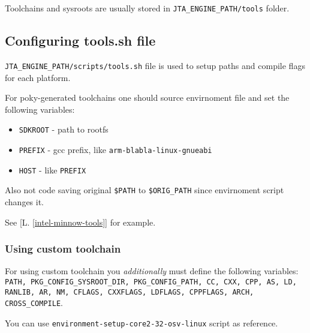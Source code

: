 




Toolchains and sysroots are usually stored in \texttt{JTA\_ENGINE\_PATH/tools} folder.

\subsection{Configuring tools.sh file}
\texttt{JTA\_ENGINE\_PATH/scripts/tools.sh} file is used to setup paths and compile flags for each platform.

For poky-generated toolchains one should source envirnoment file and set the following variables:
\begin{itemize}
\item \texttt{SDKROOT} - path to rootfs
\item \texttt{PREFIX} - gcc prefix, like \texttt{arm-blabla-linux-gnueabi}
\item \texttt{HOST} - like \texttt{PREFIX}
\end{itemize}

Also not code saving original \texttt{\$PATH} to \texttt{\$ORIG\_PATH} since envirnoment script changes it.

See [L. \ref{intel-minnow-tools}] for example.

\subsubsection{Using custom toolchain}
\label {subsec:custom-toolchain-tools-sh}

For using custom toolchain you \emph{additionally} must define the following variables: \texttt{PATH, PKG\_CONFIG\_SYSROOT\_DIR, PKG\_CONFIG\_PATH, CC, CXX, CPP, AS, LD, RANLIB, AR, NM, CFLAGS, CXXFLAGS, LDFLAGS, CPPFLAGS, ARCH, CROSS\_COMPILE}.

You can use \texttt{environment-setup-core2-32-osv-linux} script as reference.

